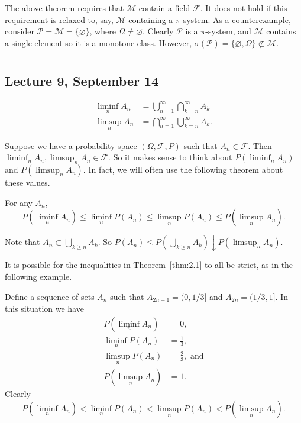 \documentclass[11pt,fleqn]{book} %
\begin{document}
\begin{example} \label{ex:1.7}
	The above theorem requires that $\mathcal{M}$ contain a field $\mathcal{F}$. It does not hold if this requirement is relaxed to, say, $\mathcal{M}$ containing a $\pi$-system. As a counterexample, consider $\mathcal{P} = \mathcal{M} = \{\varnothing\}$, where $\Omega \neq \varnothing$. Clearly $\mathcal{P}$ is a $\pi$-system, and $\mathcal{M}$ contains a single element so it is a monotone class. However, $\sigma(\mathcal{P}) = \{\varnothing, \Omega\} \not\subset \mathcal{M}$.
\end{example}

\chapter{}

\section{Lecture 9, September 14}

\begin{definition} \label{def:limit-sets}
	\begin{align*}
		\liminf_n A_n &= \bigcup_{n=1}^\infty \bigcap_{k=n}^\infty A_k \\
		\limsup_n A_n &= \bigcap_{n=1}^\infty \bigcup_{k=n}^\infty A_k.
	\end{align*}
\end{definition}

Suppose we have a probability space $(\Omega,\mathcal{F},P)$ such that $A_n \in \mathcal{F}$. Then $\liminf_n A_n, \limsup_n A_n \in \mathcal{F}$. So it makes sense to think about $P(\liminf_n A_n)$ and $P(\limsup_n A_n)$. In fact, we will often use the following theorem about these values.

\begin{theorem} \label{thm:2.1}
	For any $A_n$,
	\[
		P\left(\liminf_n A_n\right) \leq \liminf_n P(A_n) \leq \limsup_n P(A_n) \leq P\left(\limsup_n A_n\right).
	\]
\end{theorem}

Note that $A_n \subset \bigcup_{k \geq n} A_k$. So $P(A_n) \leq P \left( \bigcup_{k \geq n} A_k \right) \downarrow P \left( \limsup_n A_n \right)$.

It is possible for the inequalities in Theorem~\ref{thm:2.1} to all be strict, as in the following example.

\begin{example} \label{ex:strict-ineq-liminf-limsup}
	Define a sequence of sets $A_n$ such that $A_{2n+1} = (0,1/3]$ and $A_{2n} = (1/3,1]$. In this situation we have
	\begin{align*}
		P \left( \liminf_n A_n \right) &= 0, \\
		\liminf_n P(A_n) &= \frac{1}{3}, \\
		\limsup_n P(A_n) &= \frac{2}{3}, \textrm{ and} \\
		P \left( \limsup_n A_n \right) &= 1.
	\end{align*}
	Clearly
	\[
		P\left(\liminf_n A_n\right) < \liminf_n P(A_n) < \limsup_n P(A_n) < P\left(\limsup_n A_n\right).
	\]
\end{example}
\end{document}
